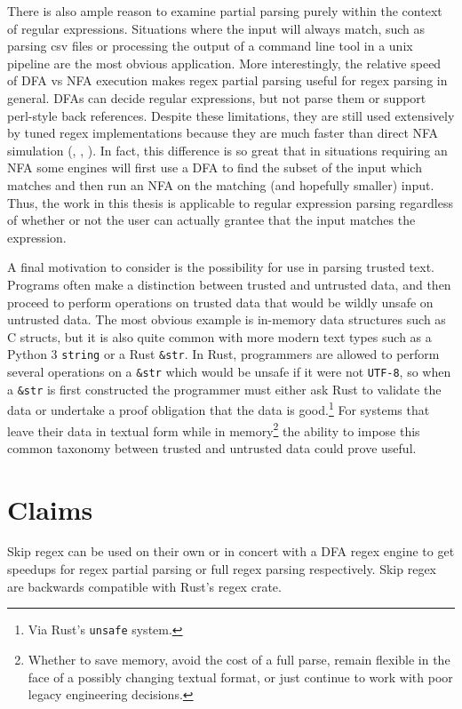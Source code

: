 There is also ample reason to examine partial parsing purely
within the context of regular expressions. Situations where the input
will always match, such as parsing csv files
or processing the output of a command line tool in a unix pipeline
are the most obvious application. More interestingly, the
relative speed of DFA vs NFA execution makes regex partial parsing
useful for regex parsing in general. DFAs can decide regular expressions,
but not parse them or support perl-style back references. Despite
these limitations, they are still used extensively by tuned regex
implementations because they are much faster than direct NFA
simulation (\cite{CoxRE2}, \cite{GallantRegex}, \cite{GoLang}).
In fact, this difference is so great that in situations requiring
an NFA some engines will first use a DFA to find the subset of the input
which matches and then run an NFA on the matching (and hopefully
smaller) input. Thus, the work in this thesis is applicable
to regular expression parsing regardless of whether or not the user
can actually grantee that the input matches the expression.

A final motivation to consider is the possibility for use
in parsing trusted text. Programs often make a distinction between
trusted and untrusted data, and then proceed to perform operations
on trusted data that would be wildly unsafe on untrusted data.
The most obvious example is in-memory data structures such as C structs, but
it is also quite common with more modern text types such as
a Python 3 \verb'string' or a Rust \verb'&str'. In Rust, programmers
are allowed to perform several operations on a \verb'&str' which
would be unsafe if it were not \verb'UTF-8', so when a \verb'&str'
is first constructed the programmer must either ask Rust to validate
the data or undertake a proof obligation that the data is good.\footnote{
Via Rust's {\tt unsafe} system.} For systems that leave
their data in textual form while in memory\footnote{
Whether to save memory, avoid the cost of a full parse, remain
flexible in the face of a possibly changing textual format, or
just continue to work with poor legacy engineering decisions.}
the ability to impose this common taxonomy between trusted and
untrusted data could prove useful.

\section{Claims}

Skip regex can be used on their own or
in concert with a DFA regex engine to get speedups for
regex partial parsing or full regex parsing respectively.
Skip regex are backwards compatible with Rust's regex crate.

